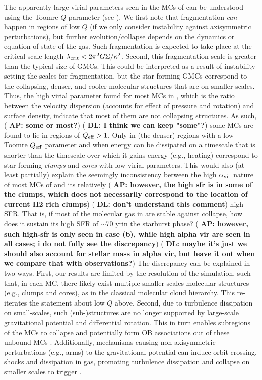 \IfFileExists{emulateapjlegacy.cls}{\documentclass[iop]{emulateapjlegacy}}{\documentclass[iop]{emulateapj}}
\newcommand{\AP}[1]{({\bf \color{apcolor} AP: #1})}
\newcommand{\DL}[1]{({\bf \color{dlcolor} DL: #1})}
\begin{document}
The apparently large virial parameters seen in the MCs of \flower can be understood using the Toomre $Q$ parameter (see ). We first note that fragmentation {\it can} happen in regions of low $Q$ (if we only consider instability against axisymmetric perturbations), but further evolution/collapse depends on the dynamics or equation of state of the gas.
%
Such fragmentation is expected to take place at the critical scale length $\lambda_{\rm crit} < 2 \pi^2 G \Sigma / \kappa^2$. Second, this fragmentation scale is greater than the typical size of GMCs. This could be interpreted as a result of instability setting the scales for fragmentation, but the star-forming GMCs correspond to the collapsing, denser, and cooler molecular structures that are on smaller scales.
%
Thus, the high virial parameter found for most MCs in \flower, which is the ratio between the velocity dispersion (accounts for effect of pressure and rotation) and surface density, indicate that most of them are not collapsing structures. As such, \AP{some or most?}
\DL{I think we can keep "some"?}
some MCs are found to lie in regions of $Q_{\rm eff}>1$.
Only in (the denser) regions with a low Toomre $Q_{\rm eff}$ parameter and when energy can be dissipated on a timescale that is shorter than the timescale over which it gains energy (e.g., heating) correspond to star-forming {\it clumps} and {\it cores} with low virial parameters.
%
This would also (at least partially) explain the seemingly inconsistency between the high $\alpha_{\rm vir}$ nature of most MCs of \flower and its relatively \AP{however, the high sfr is in some of the clumps, which does not necessarily correspond to the location of current H2 rich clumps}
\DL{don't understand this comment}
high SFR. That is, if most of the molecular gas in \flower are stable against collapse, how does it sustain its high SFR of $\sim$70\,\Msun\,yr\pmOne in the starburst phase?
%
\AP{however, such high-sfr is only seen in case (b), while high alpha vir are seen in all cases; i do not fully see the discrepancy}
\DL{maybe it's just we should also account for stellar mass in alpha vir, but leave it out when we compare that with observations?}
The discrepancy can be explained in two ways. First, our results are limited by the resolution of the simulation, such that, in each MC, there likely exist multiple smaller-scales molecular structures (e.g., clumps and cores),
as in the classical molecular cloud hierarchy. This re-iterates the statement about low $Q$ above.
%
Second, due to turbulence dissipation on small-scales, such (sub-)structures are no longer supported by large-scale gravitational potential and differential rotation. This in turn enables subregions of the MCs to collapse and potentially form OB associations out of these unbound MCs \citep{Clark04a, Clark05a}.
%
Additionally, mechanisms causing non-axisymmetric perturbations (e.g., arms) to the gravitational potential can induce orbit crossing, shocks and dissipation in gas, promoting turbulence dissipation and collapse on smaller scales to trigger \SF.
\end{document}
